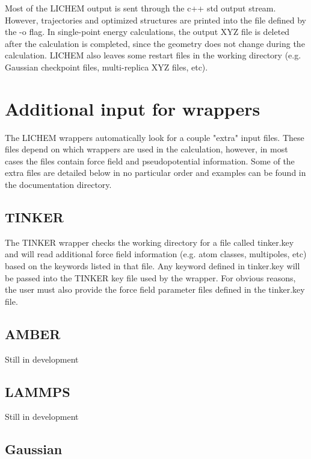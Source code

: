 \documentclass[12pt]{report}
\begin{document}
Most of the LICHEM output is sent through the c++ std output stream. However,
trajectories and optimized structures are printed into the file defined
by the -o flag. In single-point energy calculations, the output XYZ file
is deleted after the calculation is completed, since the geometry does not
change during the calculation. LICHEM also leaves some restart files in the
working directory (e.g. Gaussian checkpoint files, multi-replica XYZ files,
etc).

\section{Additional input for wrappers}

The LICHEM wrappers automatically look for a couple "extra" input files. These
files depend on which wrappers are used in the calculation, however, in most
cases the files contain force field and pseudopotential information. Some of
the extra files are detailed below in no particular order and examples can be
found in the documentation directory.

\subsection{TINKER}

The TINKER wrapper checks the working directory for a file called tinker.key
and will read additional force field information (e.g. atom classes,
multipoles, etc) based on the keywords listed in that file. Any keyword
defined in tinker.key will be passed into the TINKER key file used by the
wrapper. For obvious reasons, the user must also provide the force field
parameter files defined in the tinker.key file.

\subsection{AMBER}

{\color{red}Still in development}

\subsection{LAMMPS}

{\color{red}Still in development}

\subsection{Gaussian}
\end{document}

